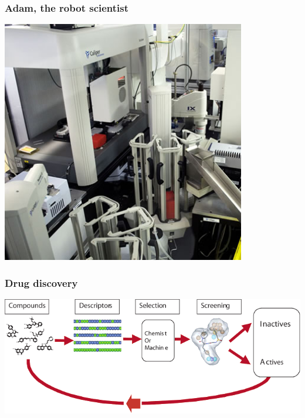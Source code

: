 \documentclass{beamer}
\begin{document}
\begin{frame}
  \frametitle{Adam, the robot scientist}
  \centering
  \includegraphics[width=0.8\textwidth]{../figures/robot-scientist}
\end{frame}



\begin{frame}
  \frametitle{Drug discovery}
  \centering
  \includegraphics[width=\columnwidth]{../figures/drug-discovery-000}
\end{frame}
\end{document}
